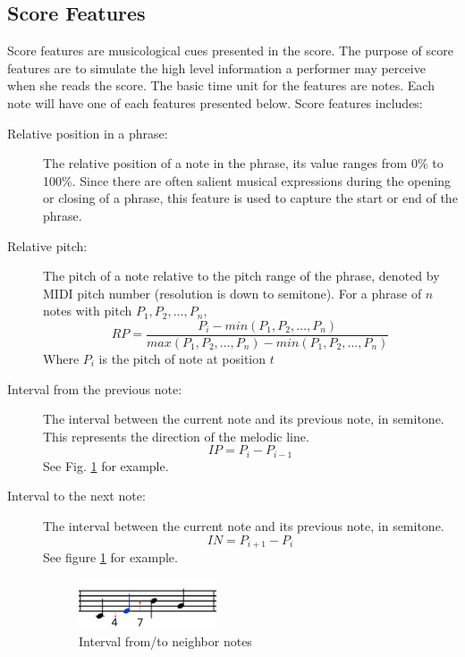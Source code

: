 \subsection{Score Features}
      Score features are musicological cues presented in the score. The purpose of score features are to simulate the high level information a performer may perceive when she reads the score. The basic time unit for the features are notes. Each note will have one of each features presented below.
      Score features includes:
      \begin{description}
         \item [Relative position in a phrase:]
            The relative position of a note in the phrase, its value ranges from 0\% to 100\%. Since there are often salient musical expressions during the opening or closing of a phrase, this feature is used to capture the start or end of the phrase.
         \item [Relative pitch:]
            The pitch of a note relative to the pitch range of the phrase, denoted by MIDI pitch number (resolution is down to semitone). For a phrase of $n$ notes with pitch $P_1, P_2, \dots, P_n$, $$RP = \frac{P_i -min(P_1, P_2, \dots, P_n) }{max(P_1, P_2, \dots, P_n)-min(P_1, P_2, \dots, P_n) }$$  Where $P_i$ is the pitch of note at position $t$

         \item [Interval from the previous note:] The interval between the current note and its previous note, in semitone. This represents the direction of the melodic line. $$IP = P_{i} - P_{i-1} $$ See Fig. \ref{fig:interval} for example.
         \item [Interval to the next note:] The interval between the current note and its previous note, in semitone. $$IN = P_{i+1} - P_i$$ See figure \ref{fig:interval} for example.
         
      \begin{figure}[tp]
         \begin{center}
            \includegraphics[width=0.4\textwidth]{fig/interval_arrow}
         \end{center}
         \caption{Interval from/to neighbor notes}
         \label{fig:interval}
      \end{figure}


\end{description}
